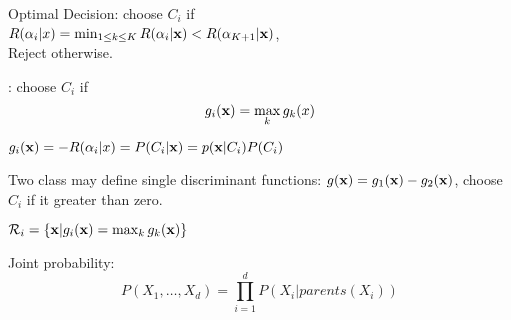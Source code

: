 \begin{description}
\[\]
\item Optimal Decision: choose $C_i$ if \\$R(\alpha_i|x) = \min_{1\leq k\leq
K}R(\alpha_i|\mathbf{x}) < R(\alpha_{K+1} | \mathbf{x})$, \\Reject otherwise.
\item [Discriminant Functions]: choose $C_i$ if \[g_i(\mathbf{x}) = \max_k
    g_k(x)\]
\item $g_i(\mathbf{x}) = -R(\alpha_i|x) = P(C_i|\mathbf{x}) = p(\mathbf{x}|C_i)P(C_i)$
\item Two class may define single discriminant functions: $g(\mathbf{x}) = g_1(\mathbf{x}) -
g_2(\mathbf{x})$, choose $C_i$ if it greater than zero.
\item [Decision Regions] $\mathcal{R}_i = \{\mathbf{x}|g_i(\mathbf{x}) = \max_k g_k(\mathbf{x})\}$
\item[Bayesian Network] Joint probability:\[P(X_1,\dots, X_d) =
    \prod_{i=1}^d P(X_i|parents(X_i))\]
\end{description}
